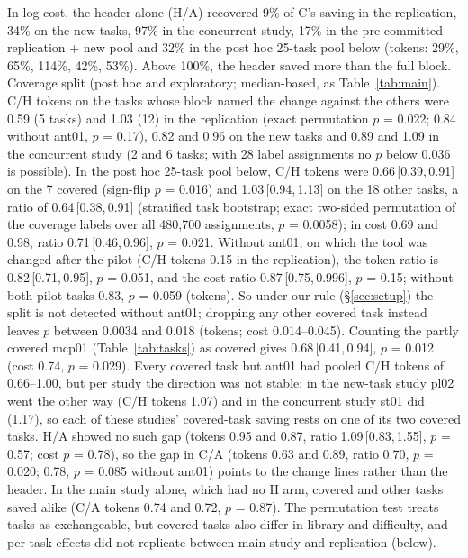 \documentclass[11pt]{article}
\newcommand{\ci}[2]{\,[#1,\,#2]}
\begin{document}
In log cost, the header alone (H/A) recovered 9\% of C's saving in the replication, 34\% on the new tasks, 97\% in the concurrent study, 17\% in the pre-committed replication + new pool and 32\% in the post hoc 25-task pool below (tokens: 29\%, 65\%, 114\%, 42\%, 53\%). Above 100\%, the header saved more than the full block.
Coverage split (post hoc and exploratory; median-based, as Table~\ref{tab:main}). C/H tokens on the tasks whose block named the change against the others were 0.59 (5 tasks) and 1.03 (12) in the replication (exact permutation $p$ = 0.022; 0.84 without ant01, $p$ = 0.17), 0.82 and 0.96 on the new tasks and 0.89 and 1.09 in the concurrent study (2 and 6 tasks; with 28 label assignments no $p$ below 0.036 is possible). In the post hoc 25-task pool below, C/H tokens were 0.66\ci{0.39}{0.91} on the 7 covered (sign-flip $p$ = 0.016) and 1.03\ci{0.94}{1.13} on the 18 other tasks, a ratio of 0.64\ci{0.38}{0.91} (stratified task bootstrap; exact two-sided permutation of the coverage labels over all 480,700 assignments, $p$ = 0.0058); in cost 0.69 and 0.98, ratio 0.71\ci{0.46}{0.96}, $p$ = 0.021. Without ant01, on which the tool was changed after the pilot (C/H tokens 0.15 in the replication), the token ratio is 0.82\ci{0.71}{0.95}, $p$ = 0.051, and the cost ratio 0.87\ci{0.75}{0.996}, $p$ = 0.15; without both pilot tasks 0.83, $p$ = 0.059 (tokens). So under our rule (\S\ref{sec:setup}) the split is not detected without ant01; dropping any other covered task instead leaves $p$ between 0.0034 and 0.018 (tokens; cost 0.014--0.045). Counting the partly covered mcp01 (Table~\ref{tab:tasks}) as covered gives 0.68\ci{0.41}{0.94}, $p$ = 0.012 (cost 0.74, $p$ = 0.029). Every covered task but ant01 had pooled C/H tokens of 0.66--1.00, but per study the direction was not stable: in the new-task study pl02 went the other way (C/H tokens 1.07) and in the concurrent study st01 did (1.17), so each of these studies' covered-task saving rests on one of its two covered tasks. H/A showed no such gap (tokens 0.95 and 0.87, ratio 1.09\ci{0.83}{1.55}, $p$ = 0.57; cost $p$ = 0.78), so the gap in C/A (tokens 0.63 and 0.89, ratio 0.70, $p$ = 0.020; 0.78, $p$ = 0.085 without ant01) points to the change lines rather than the header. In the main study alone, which had no H arm, covered and other tasks saved alike (C/A tokens 0.74 and 0.72, $p$ = 0.87). The permutation test treats tasks as exchangeable, but covered tasks also differ in library and difficulty, and per-task effects did not replicate between main study and replication (below).
\end{document}
